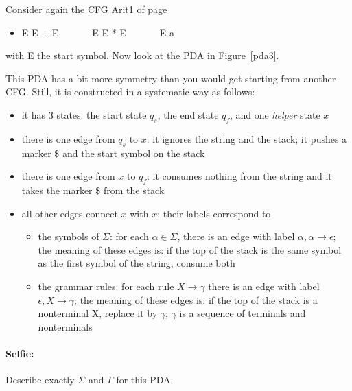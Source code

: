 \begin{example}
Consider again the CFG Arit1 of page \pageref{arit1label}
\begin{itemize}
\item E \rpijl E + E~~~~~~~E \rpijl E * E~~~~~~~E \rpijl a
\end{itemize}
with E the start symbol. Now look at the PDA in Figure~\ref{pda3}.

This PDA has a bit more symmetry than you would get starting from
another CFG. Still, it is constructed in a systematic way as follows:

%
\begin{itemize}
\item it has 3 states: the start state $q_s$, the end state $q_f$, and
 one {\em helper} state $x$

\item there is one edge from $q_s$ to $x$: it ignores the string and
  the stack; it pushes a marker \$ and the start symbol on the stack

\item there is one edge from $x$ to $q_f$: it consumes nothing from
  the string and it takes the marker \$ from the stack

\item all other edges connect $x$ with $x$; their labels correspond to
\begin{itemize}

\item the symbols of $\Sigma$: for each $\alpha \in \Sigma$, there is
  an edge with label $\alpha,\alpha \rightarrow \epsilon$; the meaning
  of these edges is: if the top of the stack is the same symbol as the
  first symbol of the string, consume both

\item the grammar rules: for each rule $X \rightarrow \gamma$ there is
  an edge with label $\epsilon, X \rightarrow \gamma$; the meaning
  of these edges is: if the top of the stack is a nonterminal X,
  replace it by $\gamma$; $\gamma$ is a sequence of terminals and
  nonterminals
\end{itemize}

\end{itemize}
\end{example}

\paragraph{Selfie:} Describe exactly $\Sigma$ and $\Gamma$ for this PDA.


